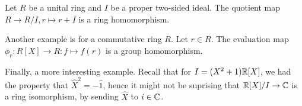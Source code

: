 \begin{example}
  Let $R$ be a unital ring and $I$ be a proper two-sided ideal. The quotient map $R\to
  R/I, r\mapsto r+I$ is a ring homomorphism.

  Another example is for a commutative ring $R$. Let $r\in R$. The evaluation map
  $\phi_r:R[X]\to R:f\mapsto f(r)$ is a group homomorphism.

  Finally, a more interesting example. Recall that for $I=(X^2+1)\mathbb R[X]$, we had the
  property that $\hat{X}^2=-\hat{1}$, hence it might not be suprising that
  $\mathbb R[X]/I\to\mathbb C$ is a ring isomorphism, by sending $\hat{X}$ to $i\in\mathbb C$.
\end{example}
